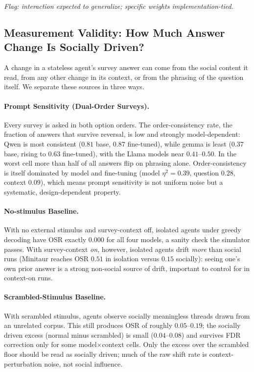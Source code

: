 \documentclass[letterpaper]{article} %
\begin{document}
\emph{Flag: interaction expected to generalize; specific weights implementation-tied.}

\subsection{Measurement Validity: How Much Answer Change Is Socially Driven?}
\label{sec:measurement}

A change in a stateless agent's survey answer can come from the social content it read, from any other change in its context, or from the phrasing of the question itself. We separate these sources in three ways.

\paragraph{Prompt Sensitivity (Dual-Order Surveys).} Every survey is asked in both option orders. The order-consistency rate, the fraction of answers that survive reversal, is low and strongly model-dependent: Qwen is most consistent ($0.81$ base, $0.87$ fine-tuned), while gemma is least ($0.37$ base, rising to $0.63$ fine-tuned), with the Llama models near $0.41$--$0.50$. In the worst cell more than half of all answers flip on phrasing alone. Order-consistency is itself dominated by model and fine-tuning (model $\eta^2 = 0.39$, question $0.28$, context $0.09$), which means prompt sensitivity is not uniform noise but a systematic, design-dependent property.

\paragraph{No-stimulus Baseline.} With no external stimulus and survey-context off, isolated agents under greedy decoding have OSR exactly $0.000$ for all four models, a sanity check the simulator passes. With survey-context \emph{on}, however, isolated agents drift \emph{more} than social runs (Minitaur reaches OSR $0.51$ in isolation versus $0.15$ socially): seeing one's own prior answer is a strong non-social source of drift, important to control for in context-on runs.

\paragraph{Scrambled-Stimulus Baseline.} With scrambled stimulus, agents observe socially meaningless threads drawn from an unrelated corpus. This still produces OSR of roughly $0.05$--$0.19$; the socially driven excess (normal minus scrambled) is small ($0.04$--$0.08$) and survives FDR correction only for some model$\times$context cells. Only the excess over the scrambled floor should be read as socially driven; much of the raw shift rate is context-perturbation noise, not social influence.
\end{document}
